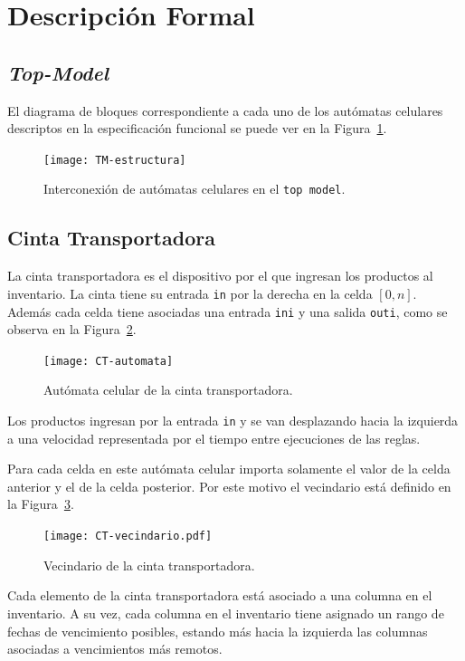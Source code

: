 \documentclass[10pt]{article}
\begin{document}
\section{Descripción Formal}

\subsection{\textit{Top-Model}}
El diagrama de bloques correspondiente a cada uno de los autómatas celulares descriptos en la especificación funcional se puede ver en la Figura~\ref{fig:TM-estructura}.

\begin{figure}[h] 
	\centering 
	\texttt{[image: TM-estructura]} 
	\caption{Interconexión de autómatas celulares en el \texttt{top model}.} 
	\label{fig:TM-estructura} 
\end{figure}

\subsection{Cinta Transportadora}\label{sec:CT}

La cinta transportadora es el dispositivo por el que ingresan los productos al inventario. La cinta tiene su entrada \texttt{in} por la derecha en la celda $[0,n]$. Además cada celda tiene asociadas una entrada \texttt{ini} y una salida \texttt{outi}, como se observa en la Figura~\ref{fig:CT-automata}. 

\begin{figure}[h] 
  \centering 
  \texttt{[image: CT-automata]} 
  \caption{Autómata celular de la cinta transportadora.} 
  \label{fig:CT-automata} 
\end{figure}
\FloatBarrier


Los productos ingresan por la entrada \texttt{in} y se van desplazando hacia la izquierda a una velocidad representada por el tiempo entre ejecuciones de las reglas.

Para cada celda en este autómata celular importa solamente el valor de la celda anterior y el de la celda posterior. Por este motivo el vecindario está definido en la Figura~\ref{fig:CT-vecindario}.

\begin{figure}[h] 
  \centering 
  \texttt{[image: CT-vecindario.pdf]} 
  \caption{Vecindario de la cinta transportadora.} 
  \label{fig:CT-vecindario} 
\end{figure}
\FloatBarrier

Cada elemento de la cinta transportadora está asociado a una columna en el inventario. A su vez, cada columna en el inventario tiene asignado un rango de fechas de vencimiento posibles, estando más hacia la izquierda las columnas asociadas a vencimientos más remotos.
\end{document}
